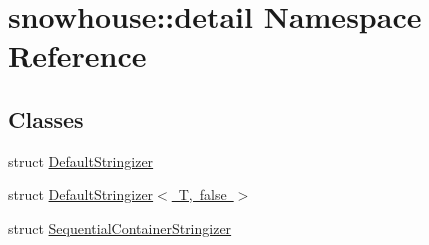 \hypertarget{namespacesnowhouse_1_1detail}{}\section{snowhouse\+::detail Namespace Reference}
\label{namespacesnowhouse_1_1detail}
\subsection*{Classes}
\begin{DoxyCompactItemize}
\item 
struct \mbox{\hyperlink{structsnowhouse_1_1detail_1_1DefaultStringizer}{Default\+Stringizer}}
\item 
struct \mbox{\hyperlink{structsnowhouse_1_1detail_1_1DefaultStringizer_3_01T_00_01false_01_4}{Default\+Stringizer$<$ T, false $>$}}
\item 
struct \mbox{\hyperlink{structsnowhouse_1_1detail_1_1SequentialContainerStringizer}{Sequential\+Container\+Stringizer}}
\end{DoxyCompactItemize}
